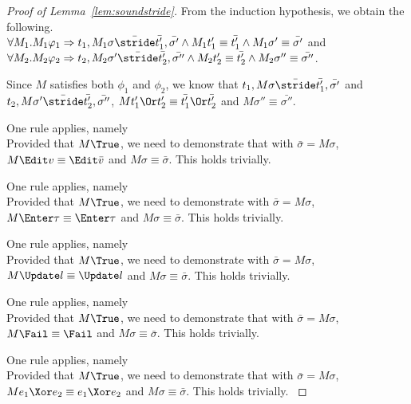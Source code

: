 \begin{proof}[Proof of Lemma~\ref{lem:soundstride}]
{{    From the induction hypothesis, we obtain the following.\\
    $\forall M_1 . M_1 \phi_1 \implies t_1,M_1\sigma \bar{\stride} \bar{t_1'},\bar{\sigma'}\land M_1 t_1'\equiv\bar{t_1'}\land M_1\sigma' \equiv \bar{\sigma'}$ and\\
    $\forall M_2 . M_2 \phi_2 \implies t_2,M_2\sigma' \bar{\stride} \bar{t_2'},\bar{\sigma''}\land M_2 t_2'\equiv\bar{t_2'}\land M_2\sigma'' \equiv \bar{\sigma''}$.

    Since $M$ satisfies both $\phi_1$ and $\phi_2$,
    we know that $t_1,M\sigma \bar{\stride} \bar{t_1'},\bar{\sigma'}$ and $t_2,M\sigma'\bar{\stride}\bar{t_2'},\bar{\sigma''}$,
    $M t_1'\Or t_2'\equiv \bar{t_1'}\Or\bar{t_2'}$ and $M\sigma''\equiv \bar{\sigma''}$.

    }
  }

  {One rule applies, namely \\
  Provided that $M\True$, we need to demonstrate that  with $\bar{\sigma}=M\sigma$,
  $M\Edit v \equiv \Edit \bar{v}$ and $M\sigma \equiv \bar{\sigma}$.
  This holds trivially.

  }

  {One rule applies, namely \\
  Provided that $M\True$, we need to demonstrate  with $\bar{\sigma}=M\sigma$,
  $M\Enter \tau \equiv \Enter \tau$ and $M\sigma \equiv \bar{\sigma}$.
  This holds trivially.
  }

  {One rule applies, namely \\
  Provided that $M\True$, we need to demonstrate  with $\bar{\sigma}=M\sigma$,
  $M\Update l \equiv \Update l$ and $M\sigma \equiv \bar{\sigma}$.
  This holds trivially.
  }

  {One rule applies, namely \\
  Provided that $M\True$, we need to demonstrate that  with $\bar{\sigma}=M\sigma$,
  $M\Fail \equiv \Fail$ and $M\sigma \equiv \bar{\sigma}$.
  This holds trivially.
  }

  {One rule applies, namely \\
  Provided that $M\True$, we need to demonstrate that  with $\bar{\sigma}=M\sigma$,
  $M e_1\Xor e_2 \equiv e_1\Xor e_2$ and $M\sigma \equiv \bar{\sigma}$.
  This holds trivially.
  }


\end{proof}
